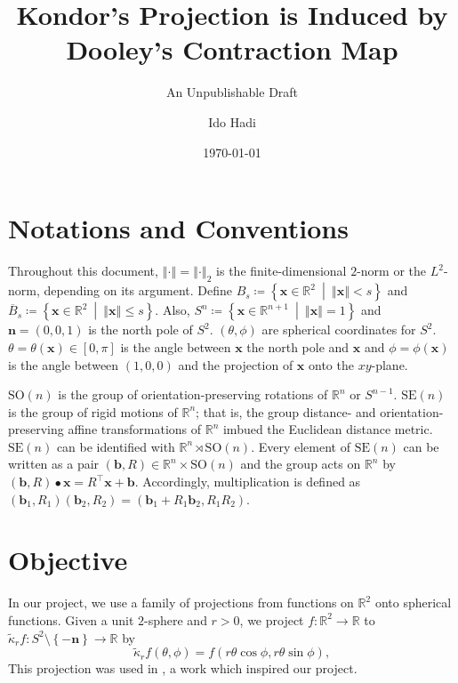 \documentclass[a4paper,11pt]{scrartcl}
\title{Kondor's Projection is Induced by Dooley's Contraction Map}
\subtitle{An Unpublishable Draft}
\author{Ido Hadi}
\date{\today}
\numberwithin{dummy}{section}
\theoremstyle{plain}
\theoremstyle{plain}
\theoremstyle{plain}
\theoremstyle{plain}
\theoremstyle{nonumberplain}
\newcommand{\F}[1][R]{\mathbb{#1}} %
\newcommand{\setsep}{\ \middle|\ } %
\newcommand{\Ltwonorm}[1]{\left\Vert #1 \right\Vert} %
\newcommand{\SE}{\mathrm{SE}}
\newcommand{\SO}{\mathrm{SO}}
\begin{document}
	
	\maketitle
	
	\tableofcontents
	
	\section{Notations and Conventions}
	Throughout this document, $ \Ltwonorm{\cdot} = \Ltwonorm{\cdot}_{2} $ is the finite-dimensional $ 2 $-norm or the $ L^{2} $-norm, depending on its argument. Define $ B_{s} \coloneqq \left\{ \mathbf{x} \in \F^{2} \setsep \Ltwonorm{\mathbf{x}} < s \right\} $ and $ \overline{B}_{s} \coloneqq \left\{ \mathbf{x} \in \F^{2} \setsep \Ltwonorm{\mathbf{x}} \le s \right\} $. Also, $ S^{n} \coloneqq \left\{ \mathbf{x}\in\F^{n+1} \setsep \Ltwonorm{\mathbf{x}} = 1 \right\} $ and $ \mathbf{n} = \left( 0, 0, 1 \right) $ is the north pole of $ S^{2} $. $ (\theta, \phi) $ are spherical coordinates for $ S^{2} $. $ \theta = \theta (\mathbf{x}) \in [0, \pi] $  is the angle between $ \mathbf{x} $ the north pole and $ \mathbf{x} $ and $ \phi = \phi (\mathbf{x}) $ is the angle between $ (1, 0, 0) $ and the projection of $ \mathbf{x} $ onto the $ xy $-plane.
	
	$ \SO(n) $ is the group of orientation-preserving rotations of $ \F^{n} $ or $ S^{n-1} $. $ \SE(n) $ is the group of rigid motions of $ \F^{n} $; that is, the group distance- and orientation-preserving affine transformations of $ \F^{n} $ imbued the Euclidean distance metric. $ \SE(n) $ can be identified with $ \F^{n} \rtimes \SO(n) $. Every element of $ \SE(n) $ can be written as a pair $ \left(\mathbf{b}, R \right) \in \F^{n} \times \SO(n) $ and the group acts on $ \F^{n} $ by $ (\mathbf{b}, R) \bullet \mathbf{x} = R^{\top} \mathbf{x} + \mathbf{b} $. Accordingly, multiplication is defined as $ (\mathbf{b}_{1}, R_{1}) ( \mathbf{b}_{2}, R_{2} ) = (\mathbf{b}_{1} + R_{1}\mathbf{b}_{2}, R_{1} R_{2}) $.
	
	\section{Objective}
	In our project, we use a family of projections from functions on $ \F^{2} $ onto spherical functions. Given a unit $ 2 $-sphere and $ r > 0 $, we project $ f : \F^{2} \to \F $ to $ \widetilde{\kappa}_{r} f : S^{2} \setminus \left\{ - \mathbf{n} \right\} \to \F $ by 
	\begin{equation}
	\label{projection}
	\widetilde{\kappa}_{r} f (\theta, \phi)
	= f \left( r \theta \cos \phi, r \theta \sin \phi\right),
	\end{equation}
	This projection was used in \textcite{Kondor2007}, a work which inspired our project.
	
\end{document}
